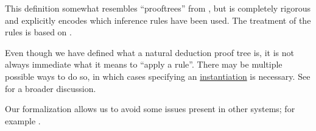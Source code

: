 \begin{comments}
  \item This definition somewhat resembles \enquote{prooftrees} from , but is completely rigorous and explicitly encodes which inference rules have been used. The treatment of the rules is based on \cite[\S 2.1]{TroelstraSchwichtenberg2000BasicProofTheory}.

  \item Even though we have defined what a natural deduction proof tree is, it is not always immediate what it means to \enquote{apply a rule}. There may be multiple possible ways to do so, in which cases specifying an \hyperref[def:propositional_schema_instantiation]{instantiation} is necessary. See  for a broader discussion.

  \item Our formalization allows us to avoid some issues present in other systems; for example .
\end{comments}

